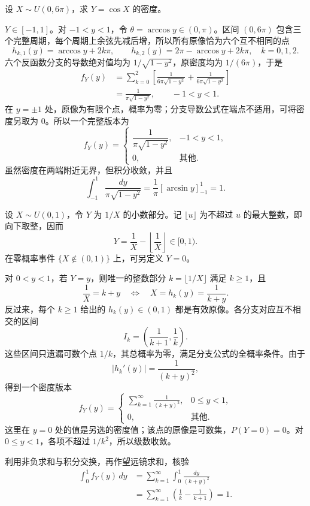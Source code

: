 \begin{example}[均匀随机变量的余弦变换]
设 $X\sim U(0,6\pi)$，求 $Y=\cos X$ 的密度。

$Y\in[-1,1]$。对 $-1<y<1$，令 $\theta=\arccos y\in(0,\pi)$。区间 $(0,6\pi)$ 包含三个完整周期，每个周期上余弦先减后增，所以所有原像恰为六个互不相同的点
\[
h_{k,1}(y)=\arccos y+2k\pi,\qquad
h_{k,2}(y)=2\pi-\arccos y+2k\pi,
\quad k=0,1,2.
\]
六个反函数分支的导数绝对值均为 $1/\sqrt{1-y^2}$，原密度均为 $1/(6\pi)$，于是
\begin{align*}
f_Y(y)
&=\sum_{k=0}^2
\left[
\frac1{6\pi\sqrt{1-y^2}}+
\frac1{6\pi\sqrt{1-y^2}}
\right]\\
&=\frac1{\pi\sqrt{1-y^2}},\qquad -1<y<1.
\end{align*}
在 $y=\pm1$ 处，原像为有限个点，概率为零；分支导数公式在端点不适用，可将密度另取为 $0$。所以一个完整版本为
\[
f_Y(y)=
\begin{cases}
\dfrac1{\pi\sqrt{1-y^2}},&-1<y<1,\\
0,&\text{其他}.
\end{cases}
\]
虽然密度在两端附近无界，但积分收敛，并且
\[
\int_{-1}^1\frac{dy}{\pi\sqrt{1-y^2}}
=\frac1\pi\left[\arcsin y\right]_{-1}^1=1.
\]
\end{example}

\begin{example}[倒数的小数部分与可数个反函数分支]
设 $X\sim U(0,1)$，令 $Y$ 为 $1/X$ 的小数部分。记 $\lfloor u\rfloor$ 为不超过 $u$ 的最大整数，即向下取整，因而
\[
Y=\frac1X-\left\lfloor\frac1X\right\rfloor\in[0,1).
\]
在零概率事件 $\{X\notin(0,1)\}$ 上，可另定义 $Y=0$。

对 $0<y<1$，若 $Y=y$，则唯一的整数部分 $k=\lfloor1/X\rfloor$ 满足 $k\geq1$，且
\[
\frac1X=k+y
\quad\Longleftrightarrow\quad X=h_k(y)=\frac1{k+y}.
\]
反过来，每个 $k\geq1$ 给出的 $h_k(y)\in(0,1)$ 都是有效原像。各分支对应互不相交的区间
\[
I_k=\left(\frac1{k+1},\frac1k\right).
\]
这些区间只遗漏可数个点 $1/k$，其总概率为零，满足分支公式的全概率条件。由于
\[
|h_k'(y)|=\frac1{(k+y)^2},
\]
得到一个密度版本
\[
f_Y(y)=
\begin{cases}
\displaystyle\sum_{k=1}^{\infty}\frac1{(k+y)^2},&0\leq y<1,\\
0,&\text{其他}.
\end{cases}
\]
这里在 $y=0$ 处的值是另选的密度值；该点的原像是可数集，$P(Y=0)=0$。对 $0\leq y<1$，各项不超过 $1/k^2$，所以级数收敛。

利用非负求和与积分交换，再作望远镜求和，核验
\begin{align*}
\int_0^1 f_Y(y)\,dy
&=\sum_{k=1}^{\infty}\int_0^1\frac{dy}{(k+y)^2}\\
&=\sum_{k=1}^{\infty}\left(\frac1k-\frac1{k+1}\right)
=1.
\end{align*}
\end{example}

